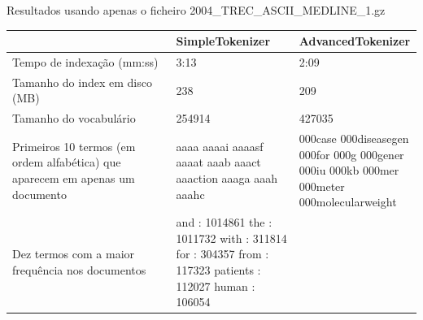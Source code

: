 \documentclass[12pt]{article}
\begin{document}
Resultados usando apenas o ficheiro 2004\_TREC\_ASCII\_MEDLINE\_1.gz \\

\begin{tabular}{| p{0.4\linewidth} | p{0.3\linewidth} | p{0.3\linewidth} |}
        \hline
        & \bf SimpleTokenizer & \bf AdvancedTokenizer \\ \hline
        Tempo de indexação (mm:ss) & 3:13 & 2:09 \\ \hline
        Tamanho do index em disco (MB) & 238 & 209 \\ \hline
        Tamanho do vocabulário & 254914 & 427035\\ \hline
        Primeiros 10 termos (em ordem
        alfabética) que aparecem em
        apenas um documento
        &
        aaaa \newline
        aaaai \newline
        aaaasf \newline
        aaaat \newline
        aaab \newline
        aaact \newline
        aaaction \newline
        aaaga \newline
        aaah \newline
        aaahc
        &
        000case \newline
        000diseasegen \newline
        000for \newline
        000g \newline
        000gener \newline
        000iu \newline
        000kb \newline
        000mer \newline
        000meter \newline
        000molecularweight
        \\ \hline
        Dez termos com a maior frequência nos documentos
        &
       and : 1014861 \newline
       the : 1011732 \newline
      with : 311814 \newline
       for : 304357 \newline
      from : 117323 \newline
  patients : 112027 \newline
     human : 106054 \newline

\end{tabular}
\end{document}

